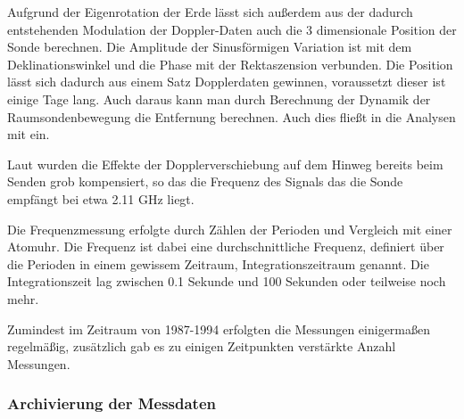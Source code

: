 Aufgrund der Eigenrotation der Erde lässt sich außerdem aus der dadurch entstehenden Modulation der Doppler-Daten auch die 3 dimensionale Position der Sonde berechnen. Die Amplitude der Sinusförmigen Variation ist mit dem Deklinationswinkel und die Phase mit der Rektaszension verbunden. Die Position lässt sich dadurch aus einem Satz Dopplerdaten gewinnen, voraussetzt dieser ist einige Tage lang. Auch daraus kann man durch Berechnung der Dynamik der Raumsondenbewegung die Entfernung berechnen. Auch dies fließt in die Analysen mit ein.\cite{Anderson2002} %

Laut \cite{Markwardt2002} wurden die Effekte der Dopplerverschiebung auf dem Hinweg bereits beim Senden grob kompensiert, so das die Frequenz des Signals das die Sonde empfängt bei etwa 2.11 GHz liegt.

Die Frequenzmessung erfolgte durch Zählen der Perioden und Vergleich mit einer Atomuhr.\cite{Nieto2007} %
Die Frequenz ist dabei eine durchschnittliche Frequenz, definiert über die Perioden in einem gewissem Zeitraum, Integrationszeitraum genannt. Die Integrationszeit lag zwischen 0.1 Sekunde und 100 Sekunden oder teilweise noch mehr.\cite{Markwardt2002}

Zumindest im Zeitraum von 1987-1994 erfolgten die Messungen einigermaßen regelmäßig, zusätzlich gab es zu einigen Zeitpunkten verstärkte Anzahl Messungen.\cite{Markwardt2002} %



\subsubsection{Archivierung der Messdaten}


